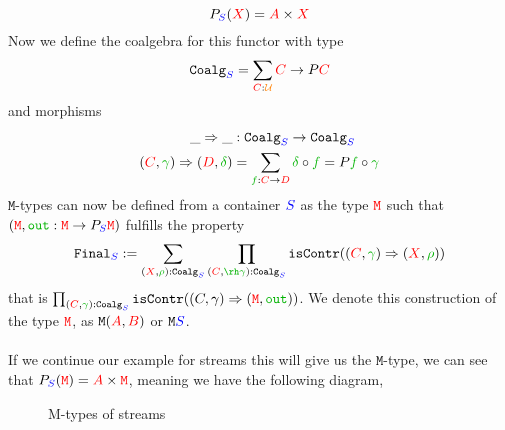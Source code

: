 \documentclass[twoside,11pt,openright]{report}
\newcommand*{\term}[1]{\textcolor{green!70!black}{#1}}
\newcommand*{\type}[1]{\textcolor{red}{#1}}
\newcommand*{\container}[1]{\textcolor{blue}{#1}}
\newcommand*{\universe}[1]{\textcolor{orange}{#1}}
\begin{document}
\begin{equation}
  P_{\container{S}}(\type{X}) = \type{A} \times \type{X}
\end{equation}
Now we define the coalgebra for this functor with type
\begin{equation}
  \mathtt{Coalg}_{\container{S}} = \sum_{\type{C} : \universe{\mathcal{U}}} \type{C} \rightarrow P\type{C}
\end{equation}
and morphisms
\begin{equation}
  \begin{aligned}
    \_\Rightarrow\_ &: \mathtt{Coalg}_{\container{S}} \rightarrow \mathtt{Coalg}_{\container{S}} \\
    (\type{C},\term{\gamma}) \Rightarrow (\type{D},\term{\delta}) &= \sum_{\term{f} : \type{C} \rightarrow \type{D}} \term{\delta} \circ \term{f} = P \term{f} \circ \term{\gamma}
  \end{aligned}
\end{equation}
\(\mathtt{M}\)-types can now be defined from a container \(\container{S}\) as the type \(\type{\mathtt{M}}\) such that \((\type{\mathtt{M}},\term{\mathtt{out}} : \type{\mathtt{M}} \rightarrow P_{\container{S}}\type{\mathtt{M}})\) fulfills the property
\begin{equation}
  \mathtt{Final}_{\container{S}} := \sum_{(\type{X},\term{\rho}) : \mathtt{Coalg}_{\container{S}}} \prod_{{(\type{C},\term{\rh\gamma}) : \mathtt{Coalg}_{\container{S}}}} \mathtt{isContr}((\type{C},\term{\gamma}) \Rightarrow (\type{X},\term{\rho}))
\end{equation}
that is \(\prod_{(\type{C},\term{\gamma}) : \mathtt{Coalg}_{\container{S}}} \mathtt{isContr}((C,\gamma) \Rightarrow (\type{\mathtt{M}},\term{\mathtt{out}}))\). We denote this construction of the type \(\type{\texttt{M}}\), as \(\texttt{M}(\type{A},\type{B})\) or \(\texttt{M}\container{S}\).
\\ \\
If we continue our example for streams this will give us the \(\mathtt{M}\)-type, we can see that \(P_{\container{S}}(\type{\mathtt{M}}) = \type{A} \times \type{\mathtt{M}}\), meaning we have the following diagram,
\begin{figure}[h]
  \centering
  \caption{M-types of streams}
\end{figure}
\end{document}

